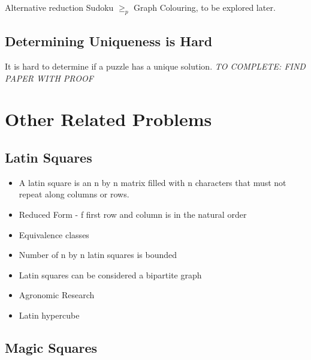 \documentclass[a4paper,12pt]{article}
\begin{document}
Alternative reduction Sudoku $\geq_p$  Graph Colouring, to be explored later.

	\subsection{Determining Uniqueness is Hard}

It is hard to determine if a puzzle has a unique solution. 	 \textit{TO COMPLETE: FIND PAPER WITH PROOF}
		
\section{Other Related Problems}
	\subsection{Latin Squares}

		\begin{itemize}
		\item{A latin square is an n by n matrix filled with n characters that must not repeat along columns or rows.}
		\item{Reduced Form - f first row and column is in the natural order}
		\item{Equivalence classes}
		\item{Number of n by n latin squares is bounded}
		\item{Latin squares can be considered a bipartite graph}
		\item{Agronomic Research}
		\item{Latin hypercube}
		\end{itemize}

	\subsection{Magic Squares}
\end{document}
